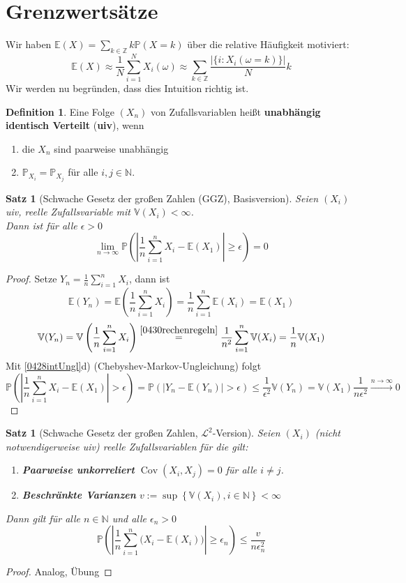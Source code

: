 \documentclass[10pt,a4paper]{article}
\newcommand{\N}{\ensuremath{\mathbb{N}}}
\newcommand{\Z}{\ensuremath{\mathbb{Z}}}
\newcommand{\abs}[1]{\left|#1\right|}
\newcommand{\Prb}{\mathbb P}
\newcommand{\Epv}{\ensuremath{\mathbb{E}}}
\newcommand{\Var}{\mathbb{V}}
\newcommand{\Cov}{\operatorname{Cov}}
\newcommand{\scL}{\mathscr L}
\theoremstyle{plain}
\newtheorem{satz}[theorem]{Satz}
\theoremstyle{definition}
\newtheorem{definition}[theorem]{Definition}
\theoremstyle{remark}
\begin{document}

\section{Grenzwertsätze}
	Wir haben $\Epv(X)=\sum_{k\in\Z}k\Prb(X=k)$ über die relative Häufigkeit motiviert: 
	\[\Epv(X)\approx\frac{1}{N}\sum_{i=1}^NX_i(\omega)\approx\sum_{k\in\Z}\frac{|\{i:X_i(\omega=k)\}|}{N}k\]
	Wir werden nu begründen, dass dies Intuition richtig ist.
	
	\begin{definition}
		Eine Folge $(X_n)$ von Zufallsvariablen heißt \textbf{unabhängig identisch Verteilt} (\textbf{uiv}), wenn
		\begin{enumerate}[label=(\roman*)]
			\item die $X_n$ sind paarweise unabhängig
			\item $\Prb_{X_i}=\Prb_{X_j}$ für alle $i,j\in\N$.
		\end{enumerate}
	\end{definition}

	\begin{satz}[Schwache Gesetz der großen Zahlen (GGZ), Basisversion]\label{0502satzGGZschwach}
		Seien $(X_i)$ uiv, reelle Zufallsvariable mit $\Var(X_i)<\infty$.\\
		Dann ist für alle $\epsilon>0$
		\[\lim\limits_{n\to\infty}\Prb\left(\abs{\frac{1}{n}\sum_{i=1}^{n}X_i-\Epv(X_1)}\geq \epsilon\right)=0\]
	\end{satz}
	\begin{proof}
		Setze $Y_n=\frac{1}{n}\sum_{i=1}^{n}X_i$, dann ist 
		\[\Epv(Y_n)=\Epv\left(\frac{1}{n}\sum_{i=1}^{n}X_i\right)=\frac{1}{n}\sum_{i=1}^{n}\Epv(X_i)=\Epv(X_1)\]
		\[\Var(Y_n)=\Var\left(\frac{1}{n}\sum_{i=1}^{n}X_i\right)\overset{\ref{0430rechenregeln}}{=}\frac{1}{n^2}\sum_{i=1}^{n}\Var(X_i)=\frac{1}{n}\Var(X_1)\]
		Mit \ref{0428intUngl}d) (Chebyshev-Markov-Ungleichung) folgt
		\[\Prb\left(\abs{\frac{1}{n}\sum_{i=1}^{n}X_i-\Epv(X_1)}>\epsilon\right)=\Prb\left(\abs{Y_n-\Epv(Y_n)}>\epsilon\right)\leq\frac{1}{\epsilon^2}\Var(Y_n)=\Var(X_1)\frac{1}{n\epsilon^2}\xrightarrow{n\to\infty}0\]
	\end{proof}

	\begin{satz}[Schwache Gesetz der großen Zahlen, $\scL^2$-Version]\label{0503satzGGZL^2}
		Seien $(X_i)$ (nicht notwendigerweise uiv) reelle Zufallsvariablen für die gilt:
		\begin{enumerate}[label=(\roman*)]
			\item \textbf{Paarweise unkorreliert} $\Cov(X_i,X_j)=0$ für alle $i\neq j$.
			\item \textbf{Beschränkte Varianzen} $v:=\sup\left\{\Var(X_i),i\in\N\right\}<\infty$
		\end{enumerate}
		Dann gilt für alle $n\in \N$ und alle $\epsilon_n>0$
		\[\Prb\left(\abs{\frac{1}{n}\sum_{i=1}^{n}\big(X_i-\Epv(X_i)\big)}\geq\epsilon_n\right)\leq\frac{v}{n\epsilon_n^2}\]
	\end{satz}
	\begin{proof}
		Analog, Übung %
	\end{proof}
	
\end{document}
